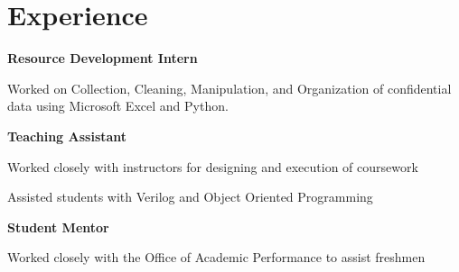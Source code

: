 \documentclass[]{resume}
\begin{document}
\begin{minipage}[t]{0.59\textwidth} 
    
    
\section{Experience}

\thinspace \textbf{Resource Development Intern}

\vspace{\topsep} %
\begin{tightemize}
\sectionsep
\item Worked on Collection, Cleaning, Manipulation, and Organization of confidential data using Microsoft Excel and Python.
\end{tightemize}  

\thinspace \textbf{Teaching Assistant}

\begin{tightemize}
\sectionsep
\item Worked closely with instructors for designing and execution of coursework 
\item Assisted students with Verilog and Object Oriented Programming
\end{tightemize}

\thinspace \textbf{Student Mentor}

\begin{tightemize}
\sectionsep
\item Worked closely with the Office of Academic Performance to assist freshmen
\end{tightemize}






\end{minipage}
\end{document}
